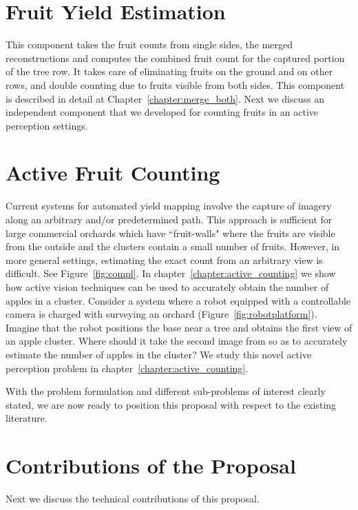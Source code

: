 \section{Fruit Yield Estimation}\label{sec:fruityield}
This component takes the fruit counts from single sides, the merged reconstructions and computes the combined fruit count for the captured portion of the tree row. It takes care of eliminating fruits on the ground and on other rows, and double counting due to fruits visible from both sides. This component is described in detail at Chapter~\ref{chapter:merge_both}. Next we discuss an independent component that we developed for counting fruits in an active perception settings.

\section{Active Fruit Counting}\label{sec:activecounting}
Current systems for automated yield mapping involve the capture of imagery along an arbitrary and/or predetermined path. This approach is sufficient for large commercial orchards which have ``fruit-walls" where the fruits are visible from the outside and the clusters contain a small number of fruits. However, in more general settings, estimating the exact count from an arbitrary view is difficult. See Figure~\ref{fig:compl}. In chapter~\ref{chapter:active_counting} we show how active vision techniques can be used to accurately obtain the number of apples in a cluster. Consider a system where a robot equipped with a controllable camera is charged with surveying an orchard (Figure~\ref{fig:robotplatform}). Imagine that the robot positions the base near a tree and obtains the first view of an apple cluster. Where should it take the second image from so as to accurately estimate the number of apples in the cluster? We study this novel active perception problem in chapter~\ref{chapter:active_counting}.

With the problem formulation and different sub-problems of interest clearly stated, we are now ready to position this proposal with respect to the existing literature.
%


\section{Contributions of the Proposal}\label{sec:intro_contrib}
Next we discuss the technical contributions of this proposal.
